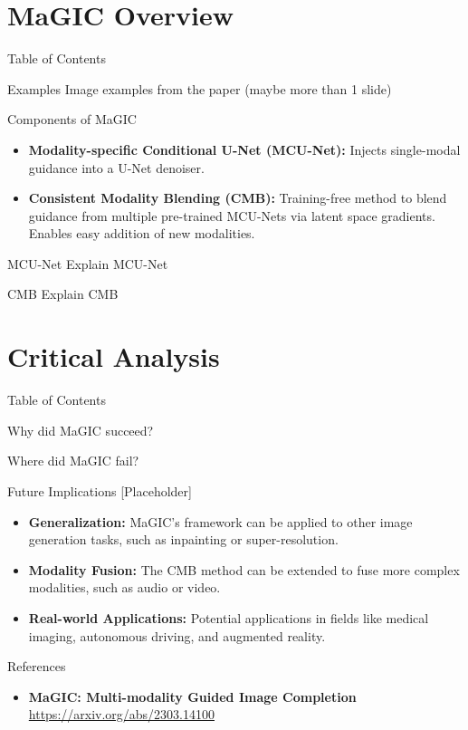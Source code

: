 \documentclass[pdf]{beamer}
\begin{document}
\section{MaGIC Overview}
\begin{frame}{Table of Contents}
    \tableofcontents[currentsection]
\end{frame}
\begin{frame}{Examples}
    Image examples from the paper (maybe more than 1 slide)
\end{frame}

\begin{frame}{Components of MaGIC}
    \begin{itemize}
        \item \textbf{Modality-specific Conditional U-Net (MCU-Net):} Injects single-modal guidance into a U-Net denoiser.
        \item \textbf{Consistent Modality Blending (CMB):} Training-free method to blend guidance from multiple pre-trained MCU-Nets via latent space gradients. Enables easy addition of new modalities.
    \end{itemize}
\end{frame}

\begin{frame}{MCU-Net}
    Explain MCU-Net
\end{frame}

\begin{frame}{CMB}
    Explain CMB
\end{frame}

\section{Critical Analysis}
\begin{frame}{Table of Contents}
    \tableofcontents[currentsection]
\end{frame}
\begin{frame}{Why did MaGIC succeed?}
    
\end{frame}

\begin{frame}{Where did MaGIC fail?}

\end{frame}

\begin{frame}{Future Implications [Placeholder]}
    \begin{itemize}
        \item \textbf{Generalization:} MaGIC's framework can be applied to other image generation tasks, such as inpainting or super-resolution.
        \item \textbf{Modality Fusion:} The CMB method can be extended to fuse more complex modalities, such as audio or video.
        \item \textbf{Real-world Applications:} Potential applications in fields like medical imaging, autonomous driving, and augmented reality.
    \end{itemize}
    
\end{frame}

\begin{frame}{References}
    \begin{itemize}
        \item \textbf{MaGIC:  Multi-modality Guided Image Completion} \\
        \url{https://arxiv.org/abs/2303.14100}
    \end{itemize}
\end{frame}
\end{document}

